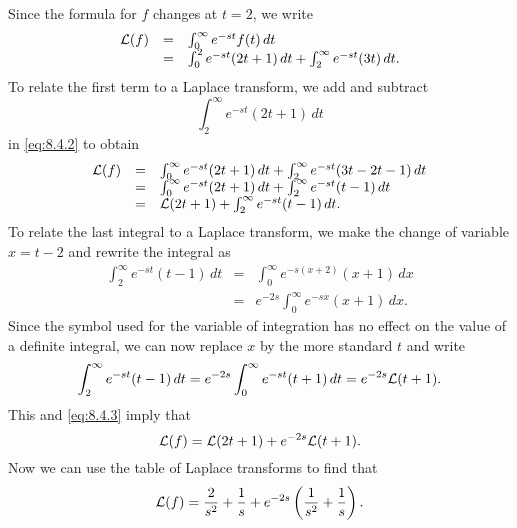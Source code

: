 \documentclass{ximera}
\begin{document}
\begin{example}
\begin{explanation}
Since the formula for $f$ changes at $t=2$, we write
\begin{equation}\label{eq:8.4.2}
\begin{array}{ccl}
{\cal L}(f)&=&\int_0^\infty e^{-st}f(t)\,dt\\
&=&\int_0^2 e^{-st}(2t+1)\,dt+\int_2^\infty e^{-st}(3t)\,dt.
\end{array}
\end{equation}
To relate the first term to a Laplace transform,  we add and subtract
$$
\int_2^\infty e^{-st}(2t+1)\,dt
$$
in \eqref{eq:8.4.2} to obtain
\begin{equation}\label{eq:8.4.3}
\begin{array}{ccl}
{\cal L}(f)&=&\int_0^\infty e^{-st}(2t+1)\,dt+
\int_2^\infty e^{-st}(3t-2t-1)\,dt\\
&=&\int_0^\infty e^{-st}(2t+1)\,dt+
\int_2^\infty e^{-st}(t-1)\,dt\\
&=&{\cal L}(2t+1)+\int_2^\infty e^{-st}(t-1)\,dt.
\end{array}
\end{equation}
To relate the last integral to a Laplace transform,
  we make the change of variable
 $x=t-2$ and rewrite the integral as
\begin{eqnarray*}
\int_2^\infty e^{-st}(t-1)\,dt&=&\int_0^\infty e^{-s(x+2)}(x+1)\,dx
\\
&=&e^{-2s}\int_0^\infty e^{-sx}(x+1)\,dx.
\end{eqnarray*}
Since the symbol used for the variable of integration has no effect on the
value of a definite integral, we can now replace $x$ by the more standard
$t$ and write
$$
\int_2^\infty e^{-st}(t-1)\,dt
=e^{-2s}\int_0^\infty e^{-st}(t+1)\,dt=e^{-2s}{\cal L}(t+1).
$$
This and \eqref{eq:8.4.3} imply that
$$
{\cal L}(f)={\cal L}(2t+1)+e^{-2s}{\cal L} (t+1).
$$
Now we can use the table of Laplace transforms to find that
$$
{\cal L}(f)=\frac{2}{s^2}+\frac{1}{s} +e^{-2s}\left(\frac{1}{s^2}+\frac{1}{s}\right).
$$
\end{explanation}
\end{example}

\end{document}
